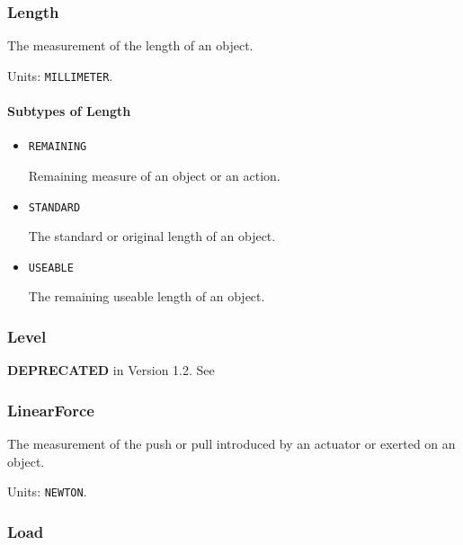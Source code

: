\subsubsection{Length}
\label{sec:Length}



The measurement of the length of an object.


Units: \texttt{MILLIMETER}.

\paragraph{Subtypes of Length}\mbox{}
\label{sec:Subtypes of Length}

\begin{itemize}

\item \texttt{REMAINING}


Remaining measure of an object or an action.

\item \texttt{STANDARD}


The standard or original length of an object.

\item \texttt{USEABLE}


The remaining useable length of an object.


\end{itemize}

\subsubsection{Level}
\label{sec:Level}



\textbf{DEPRECATED} in Version 1.2.  See 


\subsubsection{LinearForce}
\label{sec:LinearForce}



The measurement of the push or pull introduced by an actuator or exerted on an object.


Units: \texttt{NEWTON}.

\subsubsection{Load}
\label{sec:Load}



